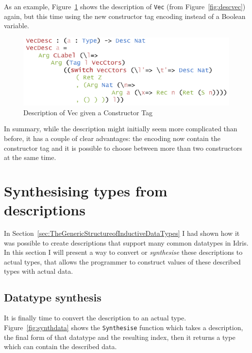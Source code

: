 \documentclass{ituthesis}
\newcommand{\tttype}[1]{\textcolor{type-color}{\texttt{#1}}}
\newcommand{\ttdec}[1]{\textcolor{declared-var-color}{\texttt{#1}}}
\theoremstyle{break}
\begin{document}
As an example, Figure~\ref{fig:vecdescim} shows the description of \tttype{Vec} (from Figure~\ref{fig:descvec}) again, but this time using the new constructor tag encoding instead of a Boolean variable.

\begin{figure}[H]
\begin{center}
    \includegraphics[scale=0.5]{Figures/VectorDescriptionImproved.png}
\end{center}
\caption{Description of Vec given a Constructor Tag}
\label{fig:vecdescim}
\end{figure}

In summary, while the description might initially seem more complicated than before, it has a couple of clear advantages: the encoding now contain the constructor tag and it is possible to choose between more than two constructors at the same time.

\section{Synthesising types from descriptions}
\label{sec:SynthesisingDescriptionstoTypes}
In Section~\ref{sec:TheGenericStructureofInductiveDataTypes} I had shown how it was possible to create descriptions that support many common datatypes in Idris.
In this section I will present a way to convert or \textit{synthesise} these descriptions to actual types, that allows the programmer to construct values of these described types with actual data.

\subsection{Datatype synthesis}
\label{sub:DatatypeSynthesis}
It is finally time to convert the description to an actual type. Figure~\ref{fig:synthdata} shows the \ttdec{Synthesise} function which takes a description, the final form of that datatype and the resulting index, then it returns a type which can contain the described data.
\end{document}
